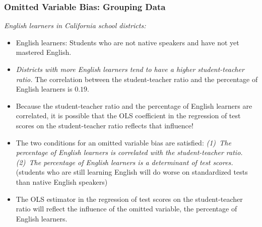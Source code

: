 \begin{frame}
\frametitle{Omitted Variable Bias: Grouping Data}
\emph{English learners in California school districts:}
\begin{itemize}
\item English learners: Students who are not native speakers and have not yet mastered English. 
\item \emph{Districts with more English learners tend to have a higher student-teacher ratio.} The correlation between the student-teacher ratio and the percentage of English learners is $0.19$.
\item Because the student-teacher ratio and the percentage of English learners are correlated, it is possible that the OLS coefficient in the regression of test scores on the student-teacher ratio reflects that influence!
\item The two conditions for an omitted variable bias are satisfied: 
\emph{(1)~The percentage of English learners is correlated with the student-teacher ratio.} 
\emph{(2)~The percentage of English learners is a determinant of test scores.} (students who are still learning English will do worse on standardized tests than native English speakers)
\item The OLS estimator in the regression of test scores on the student-teacher ratio will reflect the influence of the omitted variable, the percentage of English learners.
\end{itemize}
\end{frame}


